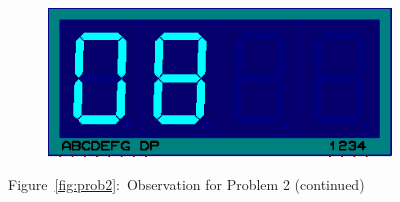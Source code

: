\documentclass{lab_sheet}
\begin{document}
\begin{figure}[H]
\begin{subfigure}{.33\textwidth}
            \centering
            \includegraphics[frame,width=.9\linewidth]{../Figures/d8}   
            \caption{}
            \label{fig:prob2-a7}
          \end{subfigure}
          \caption*{Figure~\ref{fig:prob2}:~Observation for Problem 2 (continued)}
    \end{figure}
\end{document}

